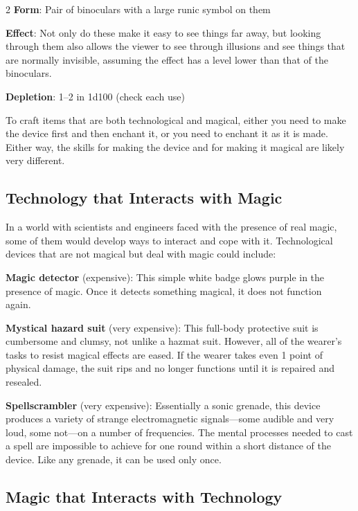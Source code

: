 \begin{multicols}{2}
\textbf{Form}: Pair of binoculars with a large runic symbol on them

\textbf{Effect}: Not only do these make it easy to see things far away, but looking through them also allows the viewer to see through illusions and see things that are normally invisible, assuming the effect has a level lower than that of the binoculars.

\textbf{Depletion}: 1–2 in 1d100 (check each use)

To craft items that are both technological and magical, either you need to make the device first and then enchant it, or you need to enchant it as it is made. Either way, the skills for making the device and for making it magical are likely very different.

\subsection{Technology that Interacts with Magic}

In a world with scientists and engineers faced with the presence of real magic, some of them would develop ways to interact and cope with it. Technological devices that are not magical but deal with magic could include:

\textbf{Magic detector} (expensive): This simple white badge glows purple in the presence of magic. Once it detects something magical, it does not function again. 

\textbf{Mystical hazard suit} (very expensive): This full-body protective suit is cumbersome and clumsy, not unlike a hazmat suit. However, all of the wearer’s tasks to resist magical effects are eased. If the wearer takes even 1 point of physical damage, the suit rips and no longer functions until it is repaired and resealed. 

\textbf{Spellscrambler} (very expensive): Essentially a sonic grenade, this device produces a variety of strange electromagnetic signals—some audible and very loud, some not—on a number of frequencies. The mental processes needed to cast a spell are impossible to achieve for one round within a short distance of the device. Like any grenade, it can be used only once.

\subsection{Magic that Interacts with Technology}


\end{multicols}
